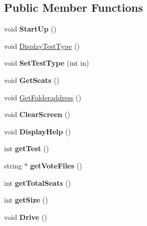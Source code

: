 \subsection*{Public Member Functions}
\begin{DoxyCompactItemize}
\item 
\mbox{\label{classDriver_a2208d65a809256e174bc0511947d19a5}} 
void {\bfseries Start\+Up} ()
\item 
void \hyperlink{classDriver_afa66a3ba1778ac080ad30b07f7915daa}{Display\+Test\+Type} ()
\item 
\mbox{\label{classDriver_a9110b66fd8fc786047317a5a653c0768}} 
void {\bfseries Set\+Test\+Type} (int in)
\item 
\mbox{\label{classDriver_acd02a66f92781df2b4c3dad62dad506b}} 
void {\bfseries Get\+Seats} ()
\item 
void \hyperlink{classDriver_a2cd4795b0b07b4018f7c0d4c5d274fa5}{Get\+Folderaddress} ()
\item 
\mbox{\label{classDriver_a8207a3147c427f6f5ac04988ad2062ea}} 
void {\bfseries Clear\+Screen} ()
\item 
\mbox{\label{classDriver_ab663de97e197b1f6842a007a31896677}} 
void {\bfseries Display\+Help} ()
\item 
\mbox{\label{classDriver_a3f4eae6573765b012d98351df5e5bc5a}} 
int {\bfseries get\+Test} ()
\item 
\mbox{\label{classDriver_a313df2bcb750e2d91bfbe61dfdf32df7}} 
string $\ast$ {\bfseries get\+Vote\+Files} ()
\item 
\mbox{\label{classDriver_a0bb8bda66543ae9a662723dfb0a5eca6}} 
int {\bfseries get\+Total\+Seats} ()
\item 
\mbox{\label{classDriver_aa3cac88980b5d7c292d1c795086495a8}} 
int {\bfseries get\+Size} ()
\item 
\mbox{\label{classDriver_a742a16dbeddf4940c05cc2c6c59dd32f}} 
void {\bfseries Drive} ()
\end{DoxyCompactItemize}


